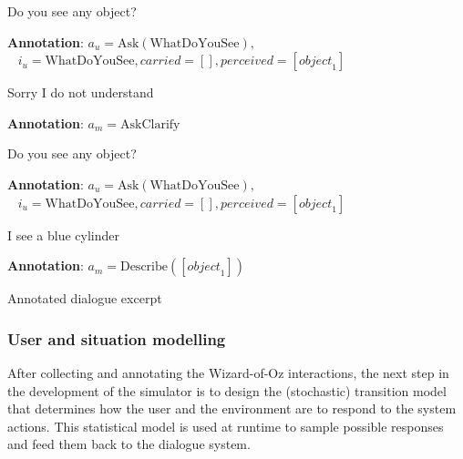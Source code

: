 \begin{Transcript}[h]
\begin{dialogue}
 Do you see any object? \\[1mm] 
\begin{footnotesize}\textbf{Annotation}: $a_u\!=\!\mathrm{Ask(WhatDoYouSee)},$\\ $\phantom{1}$ \hspace{16mm}$ i_u\!=\!\mathrm{WhatDoYouSee},\mathit{carried}\!=\![],\mathit{perceived}\!=\![\mathit{object}_1]$ \end{footnotesize} \vspace{2mm}
 Sorry I do not understand \\[1mm]
\begin{footnotesize}\textbf{Annotation}: $a_m\!=\!\mathrm{AskClarify}$ \end{footnotesize}\vspace{2mm}
 Do you see any object? \\[1mm]
\begin{footnotesize}\textbf{Annotation}: $a_u\!=\!\mathrm{Ask(WhatDoYouSee)}, $ \\ $\phantom{1}$ \hspace{16mm}$i_u\!=\! \mathrm{WhatDoYouSee}, \mathit{carried}\!=\![],\mathit{perceived}\!=\![\mathit{object}_1]$\end{footnotesize} \vspace{2mm}
 I see a blue cylinder \\[1mm]
\begin{footnotesize}\textbf{Annotation}: $a_m\!=\!\mathrm{Describe}([\mathit{object}_1])$ \end{footnotesize}
\end{dialogue}
\caption{Annotated dialogue excerpt}
\end{Transcript}


\subsubsection*{User and situation modelling}

After collecting and annotating the Wizard-of-Oz interactions, the next step in the development of the simulator is to design the (stochastic) transition model that determines how the user and the environment are to respond to the system actions. This statistical model is used at runtime to sample possible responses and feed them back to the dialogue system. 

